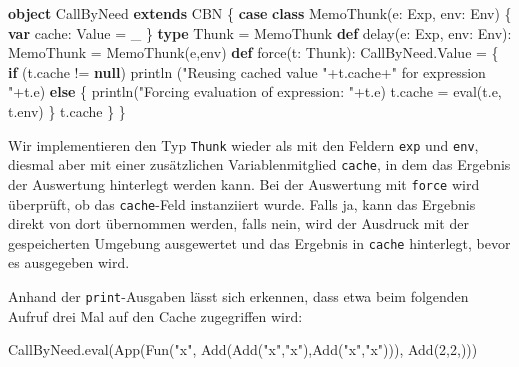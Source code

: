 \documentclass[]{article}
\newenvironment{Shaded}{}{}
\newcommand{\DecValTok}[1]{\textcolor[rgb]{0.25,0.63,0.44}{#1}}
\newcommand{\FunctionTok}[1]{\textcolor[rgb]{0.02,0.16,0.49}{#1}}
\newcommand{\KeywordTok}[1]{\textcolor[rgb]{0.00,0.44,0.13}{\textbf{#1}}}
\newcommand{\NormalTok}[1]{#1}
\newcommand{\StringTok}[1]{\textcolor[rgb]{0.25,0.44,0.63}{#1}}
\begin{document}
\begin{Shaded}
\begin{Highlighting}[]
\KeywordTok{object}\NormalTok{ CallByNeed }\KeywordTok{extends}\NormalTok{ CBN \{}
  \KeywordTok{case} \KeywordTok{class} \FunctionTok{MemoThunk}\NormalTok{(e: Exp, env: Env) \{}
    \KeywordTok{var}\NormalTok{ cache: Value = \_}
\NormalTok{  \}}
  \KeywordTok{type}\NormalTok{ Thunk = MemoThunk}
  \KeywordTok{def} \FunctionTok{delay}\NormalTok{(e: Exp, env: Env): MemoThunk = }\FunctionTok{MemoThunk}\NormalTok{(e,env)}
  \KeywordTok{def} \FunctionTok{force}\NormalTok{(t: Thunk): CallByNeed.}\FunctionTok{Value}\NormalTok{ = \{}
    \KeywordTok{if}\NormalTok{ (t.}\FunctionTok{cache}\NormalTok{ != }\KeywordTok{null}\NormalTok{)}
      \FunctionTok{println}\NormalTok{ (}\StringTok{"Reusing cached value "}\NormalTok{+t.}\FunctionTok{cache}\NormalTok{+}\StringTok{" for expression "}\NormalTok{+t.}\FunctionTok{e}\NormalTok{)}
    \KeywordTok{else}\NormalTok{ \{}
      \FunctionTok{println}\NormalTok{(}\StringTok{"Forcing evaluation of expression: "}\NormalTok{+t.}\FunctionTok{e}\NormalTok{)}
\NormalTok{      t.}\FunctionTok{cache}\NormalTok{ = }\FunctionTok{eval}\NormalTok{(t.}\FunctionTok{e}\NormalTok{, t.}\FunctionTok{env}\NormalTok{)}
\NormalTok{    \}}
\NormalTok{    t.}\FunctionTok{cache}
\NormalTok{  \}}
\NormalTok{\}}
\end{Highlighting}
\end{Shaded}

Wir implementieren den Typ \texttt{Thunk} wieder als mit den Feldern
\texttt{exp} und \texttt{env}, diesmal aber mit einer zusätzlichen
Variablenmitglied \texttt{cache}, in dem das Ergebnis der Auswertung
hinterlegt werden kann. Bei der Auswertung mit \texttt{force} wird
überprüft, ob das \texttt{cache}-Feld instanziiert wurde. Falls ja, kann
das Ergebnis direkt von dort übernommen werden, falls nein, wird der
Ausdruck mit der gespeicherten Umgebung ausgewertet und das Ergebnis in
\texttt{cache} hinterlegt, bevor es ausgegeben wird.

Anhand der \texttt{print}-Ausgaben lässt sich erkennen, dass etwa beim
folgenden Aufruf drei Mal auf den Cache zugegriffen wird:

\begin{Shaded}
\begin{Highlighting}[]
\NormalTok{CallByNeed.}\FunctionTok{eval}\NormalTok{(}\FunctionTok{App}\NormalTok{(}\FunctionTok{Fun}\NormalTok{(}\StringTok{"x"}\NormalTok{, }\FunctionTok{Add}\NormalTok{(}\FunctionTok{Add}\NormalTok{(}\StringTok{"x"}\NormalTok{,}\StringTok{"x"}\NormalTok{),}\FunctionTok{Add}\NormalTok{(}\StringTok{"x"}\NormalTok{,}\StringTok{"x"}\NormalTok{))), }\FunctionTok{Add}\NormalTok{(}\DecValTok{2}\NormalTok{,}\DecValTok{2}\NormalTok{,)))}
\end{Highlighting}
\end{Shaded}
\end{document}
